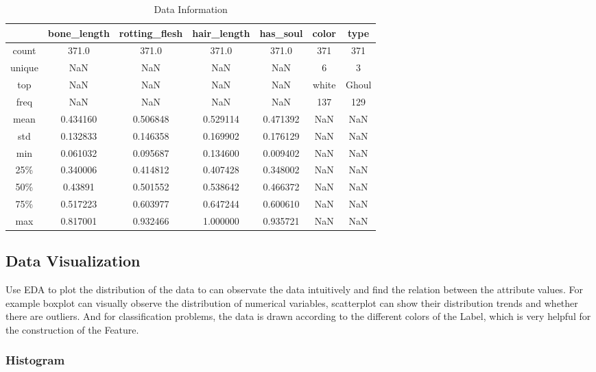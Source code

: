 \begin{table}[htbp]  \centering
	\caption{Data Information}
	\label{tbl:data information}
	\begin{tabular}{ccccccc}
		\hline
		& bone_length & rotting_flesh & hair_length & has_soul & color & type\\
		\hline
		count & 371.0 & 371.0 & 371.0 & 371.0 & 371 & 371 \\
		unique & NaN & NaN & NaN & NaN & 6 & 3 \\
		top & NaN & NaN & NaN & NaN & white & Ghoul \\
		freq & NaN & NaN & NaN & NaN & 137 & 129\\
		mean & 0.434160 & 0.506848 & 0.529114 & 0.471392 & NaN & NaN \\
		std & 0.132833 & 0.146358 & 0.169902 & 0.176129 & NaN & NaN \\
		min & 0.061032 & 0.095687 & 0.134600 & 0.009402 & NaN & NaN \\
		25\% & 0.340006 & 0.414812 & 0.407428 & 0.348002 & NaN & NaN \\
		50\% & 0.43891 & 0.501552 & 0.538642 & 0.466372 & NaN & NaN\\
		75\% & 0.517223 & 0.603977 & 0.647244 & 0.600610 & NaN & NaN\\
		max &  0.817001 & 0.932466 & 1.000000 & 0.935721 & NaN & NaN\\
		\hline 
	\end{tabular}
\end{table}


\subsection{Data Visualization}


Use EDA to plot the distribution of the data 
to can observate the data intuitively and
find the relation between the attribute values. 
For example boxplot can visually observe 
the distribution of numerical variables, 
scatterplot can show their distribution trends 
and whether there are outliers.
And for classification problems, 
the data is drawn according to 
the different colors of the Label, 
which is very helpful for 
the construction of the Feature.


\subsubsection{ Histogram}


